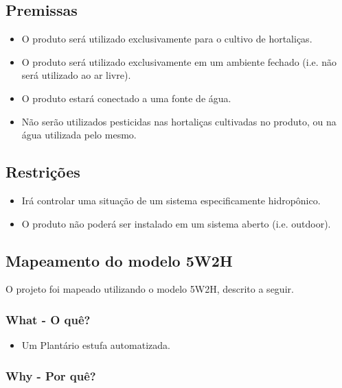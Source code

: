  \subsection{Premissas}
  
 \begin{itemize}
 	\item  O produto será utilizado exclusivamente para o cultivo de hortaliças.
 	\item O produto será utilizado exclusivamente em um ambiente fechado (i.e. não será utilizado ao ar livre).
 	\item  O produto estará conectado a uma fonte de água.
 	\item Não serão utilizados pesticidas nas hortaliças cultivadas no produto, ou na água utilizada pelo mesmo.
 \end{itemize}
  
  \subsection{Restrições}
  
  \begin{itemize}
  	\item Irá controlar uma situação de um sistema especificamente hidropônico.
  	\item O produto não poderá ser instalado em um sistema aberto (i.e. outdoor).
  \end{itemize}
                             
  \subsection{Mapeamento do modelo 5W2H}
  O projeto foi mapeado utilizando o modelo 5W2H, descrito a seguir.
	  \subsubsection{What - O quê?}
	  
		\begin{itemize}
			
			\item Um Plantário estufa automatizada.
			
		\end{itemize}
	
	  \subsubsection{Why - Por quê?}
	  
